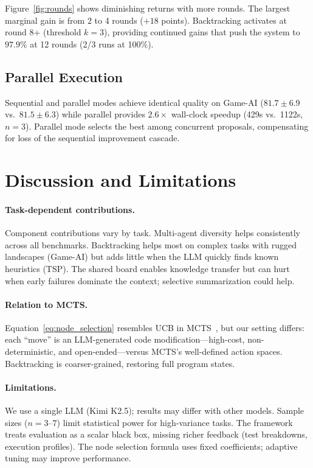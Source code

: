 \documentclass{article}
\begin{document}
Figure~\ref{fig:rounds} shows diminishing returns with more rounds. The largest marginal gain is from 2 to 4 rounds ($+18$ points). Backtracking activates at round 8+ (threshold $k{=}3$), providing continued gains that push the system to $97.9\%$ at 12 rounds (2/3 runs at 100\%).

\subsection{Parallel Execution}

Sequential and parallel modes achieve identical quality on Game-AI ($81.7 \pm 6.9$ vs.\ $81.5 \pm 6.3$) while parallel provides $2.6\times$ wall-clock speedup (429s vs.\ 1122s, $n{=}3$). Parallel mode selects the best among concurrent proposals, compensating for loss of the sequential improvement cascade.

\section{Discussion and Limitations}
\label{sec:discussion}

\paragraph{Task-dependent contributions.}
Component contributions vary by task. Multi-agent diversity helps consistently across all benchmarks. Backtracking helps most on complex tasks with rugged landscapes (Game-AI) but adds little when the LLM quickly finds known heuristics (TSP). The shared board enables knowledge transfer but can hurt when early failures dominate the context; selective summarization could help.

\paragraph{Relation to MCTS.}
Equation~\ref{eq:node_selection} resembles UCB in MCTS~\cite{coulom2006mcts, silver2017alphago}, but our setting differs: each ``move'' is an LLM-generated code modification---high-cost, non-deterministic, and open-ended---versus MCTS's well-defined action spaces. Backtracking is coarser-grained, restoring full program states.

\paragraph{Limitations.}
We use a single LLM (Kimi K2.5); results may differ with other models. Sample sizes ($n{=}3$--$7$) limit statistical power for high-variance tasks. The framework treats evaluation as a scalar black box, missing richer feedback (test breakdowns, execution profiles). The node selection formula uses fixed coefficients; adaptive tuning may improve performance.
\end{document}
